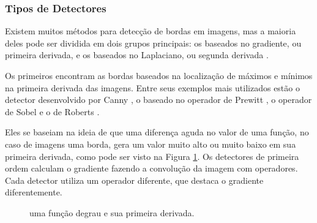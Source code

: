 \subsubsection{Tipos de Detectores}

Existem muitos métodos para detecção de bordas em imagens, mas a maioria deles pode ser dividida em dois grupos principais: os baseados no gradiente, ou primeira derivada, e os baseados no Laplaciano, ou segunda derivada \cite{tiposdetecborda}.

Os primeiros encontram as bordas baseados na localização de máximos e mínimos na primeira derivada das imagens. Entre seus exemplos mais utilizados estão o detector desenvolvido por Canny \cite{canny}, o baseado no operador de Prewitt \cite{prewitt}, o operador de Sobel \cite{citasobel} e o de Roberts \cite{roberts}.

Eles se baseiam na ideia de que uma diferença aguda no valor de uma função, no caso de imagens uma borda, gera um valor muito alto ou muito baixo em sua primeira derivada, como pode ser visto na Figura \ref{dif}. Os detectores de primeira ordem calculam o gradiente fazendo a convolução da imagem com operadores. Cada detector utiliza um operador diferente, que destaca o gradiente diferentemente.

\begin{figure}[h]
  \centering
  \hfill
  \caption{uma função degrau e sua primeira derivada.}
  \label{dif}
\end{figure}

